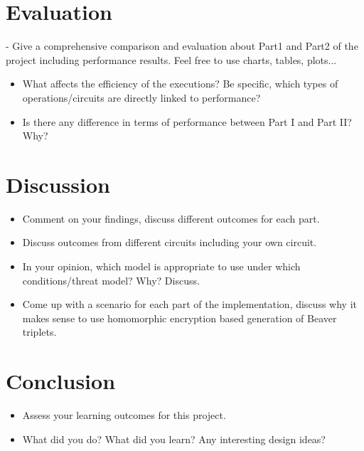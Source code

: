 \documentclass[10pt,conference,compsocconf]{IEEEtran}
\begin{document}
\section{Evaluation}
- Give a comprehensive comparison and evaluation about Part1 and Part2 of the project including performance results. Feel free to use charts, tables, plots...\\
\begin{itemize}
    \item What affects the efficiency of the executions? Be specific, which types of operations/circuits are directly linked to performance?
    \item Is there any difference in terms of performance between Part I and Part II? Why? 
\end{itemize}

\section{Discussion}
\begin{itemize}
    \item Comment on your findings, discuss different outcomes for each part.
    \item Discuss outcomes from different circuits including your own circuit.
    \item In your opinion, which model is appropriate to use under which conditions/threat model? Why? Discuss.
    \item Come up with a scenario for each part of the implementation, discuss why it makes sense to use homomorphic encryption based generation of Beaver triplets.
\end{itemize}

\section{Conclusion}
\begin{itemize}
    \item Assess your learning outcomes for this project.
    \item What did you do? What did you learn? Any interesting design ideas? 
\end{itemize}



\end{document}
